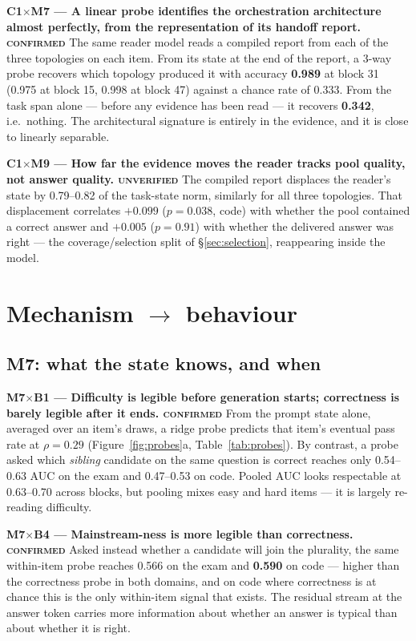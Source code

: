 \documentclass[10pt,a4paper]{article}
\newcommand{\ax}[1]{\textcolor{accent}{\textbf{#1}}}
\newcommand{\bx}[1]{\textcolor{warm}{\textbf{#1}}}
\newcommand{\mx}[1]{\textbf{#1}}
\newcommand{\trend}[1]{\medskip\noindent\textbf{#1}\quad}
\begin{document}
\trend{\ax{C1}$\times$\mx{M7} --- A linear probe identifies the orchestration architecture almost perfectly, from the representation of its handoff report. \textsc{confirmed}}
The same reader model reads a compiled report from each of the three topologies on each item. From its state at the end of the report, a 3-way probe recovers which topology produced it with accuracy \textbf{0.989} at block 31 (0.975 at block 15, 0.998 at block 47) against a chance rate of 0.333. From the task span alone --- before any evidence has been read --- it recovers \textbf{0.342}, i.e.\ nothing. The architectural signature is entirely in the evidence, and it is close to linearly separable.

\trend{\ax{C1}$\times$\mx{M9} --- How far the evidence moves the reader tracks pool quality, not answer quality. \textsc{unverified}}
The compiled report displaces the reader's state by 0.79--0.82 of the task-state norm, similarly for all three topologies. That displacement correlates $+0.099$ ($p=0.038$, code) with whether the pool contained a correct answer and $+0.005$ ($p=0.91$) with whether the delivered answer was right --- the coverage/selection split of \S\ref{sec:selection}, reappearing inside the model.

\section{Mechanism \texorpdfstring{$\to$}{->} behaviour}\label{sec:mb}

\subsection{\mx{M7}: what the state knows, and when}

\trend{\mx{M7}$\times$\bx{B1} --- Difficulty is legible before generation starts; correctness is barely legible after it ends. \textsc{confirmed}}
From the prompt state alone, averaged over an item's draws, a ridge probe predicts that item's eventual pass rate at $\rho=0.29$ (Figure~\ref{fig:probes}a, Table~\ref{tab:probes}). By contrast, a probe asked which \emph{sibling} candidate on the same question is correct reaches only 0.54--0.63 AUC on the exam and 0.47--0.53 on code. Pooled AUC looks respectable at 0.63--0.70 across blocks, but pooling mixes easy and hard items --- it is largely re-reading difficulty.

\trend{\mx{M7}$\times$\bx{B4} --- Mainstream-ness is more legible than correctness. \textsc{confirmed}}
Asked instead whether a candidate will join the plurality, the same within-item probe reaches 0.566 on the exam and \textbf{0.590} on code --- higher than the correctness probe in both domains, and on code where correctness is at chance this is the only within-item signal that exists. The residual stream at the answer token carries more information about whether an answer is typical than about whether it is right.
\end{document}
